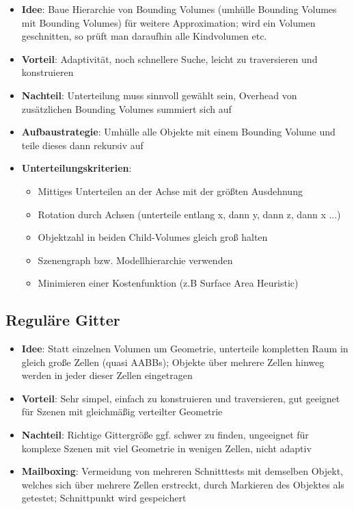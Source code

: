 \documentclass[10pt,a4paper]{article}
\begin{document}
	\begin{itemize}
		\item \textbf{Idee}: Baue Hierarchie von Bounding Volumes (umhülle Bounding Volumes mit Bounding Volumes) für weitere Approximation; wird ein Volumen geschnitten, so prüft man daraufhin alle Kindvolumen etc.
		\item \textbf{Vorteil}: Adaptivität, noch schnellere Suche, leicht zu traversieren und konstruieren
		\item \textbf{Nachteil}: Unterteilung muss sinnvoll gewählt sein, Overhead von zusätzlichen Bounding Volumes summiert sich auf
		\item \textbf{Aufbaustrategie}: Umhülle alle Objekte mit einem Bounding Volume und teile dieses dann rekursiv auf
		\item \textbf{Unterteilungskriterien}:
		\begin{itemize}
			\item Mittiges Unterteilen an der Achse mit der größten Ausdehnung
			\item Rotation durch Achsen (unterteile entlang x, dann y, dann z, dann x ...)
			\item Objektzahl in beiden Child-Volumes gleich groß halten
			\item Szenengraph bzw. Modellhierarchie verwenden
			\item Minimieren einer Kostenfunktion (z.B Surface Area Heuristic)
		\end{itemize}
	\end{itemize}
	
	\subsection{Reguläre Gitter}
	\label{ds:sub:regulaere_gitter}
	
	\begin{itemize}
		\item \textbf{Idee}: Statt einzelnen Volumen um Geometrie, unterteile kompletten Raum in gleich große Zellen (quasi AABBs); Objekte über mehrere Zellen hinweg werden in jeder dieser Zellen eingetragen
		\item \textbf{Vorteil}: Sehr simpel, einfach zu konstruieren und traversieren, gut geeignet für Szenen mit gleichmäßig verteilter Geometrie
		\item \textbf{Nachteil}: Richtige Gittergröße ggf. schwer zu finden, ungeeignet für komplexe Szenen mit viel Geometrie in wenigen Zellen, nicht adaptiv
		\item \textbf{Mailboxing}: Vermeidung von mehreren Schnitttests mit demselben Objekt, welches sich über mehrere Zellen erstreckt, durch Markieren des Objektes als getestet; Schnittpunkt wird gespeichert
	\end{itemize}
\end{document}
